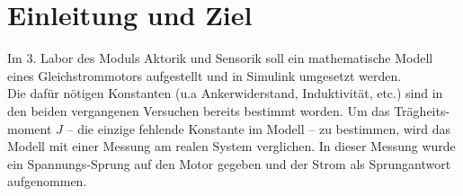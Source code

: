 \section{Einleitung und Ziel}

Im 3. Labor des Moduls Aktorik und Sensorik soll ein mathematische Modell
eines Gleichstrommotors aufgestellt und in Simulink umgesetzt werden.\\

Die dafür nötigen Konstanten (u.a Ankerwiderstand, Induktivität, etc.)
sind in den beiden vergangenen Versuchen bereits bestimmt worden.
Um das Trägheits-moment $J$ -- die einzige fehlende Konstante im Modell --
zu bestimmen, wird das Modell mit einer Messung am realen System
verglichen. In dieser Messung wurde ein Spannungs-Sprung auf den Motor
gegeben und der Strom als Sprungantwort aufgenommen.













